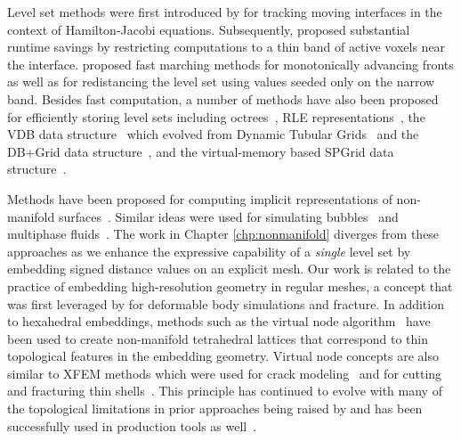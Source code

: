 Level set methods were first introduced by \citet{OsherS:1988} for tracking moving interfaces in the
context of Hamilton-Jacobi equations.  Subsequently, \citet{AdalsS:1994} proposed substantial runtime savings
by restricting computations to a thin band of active voxels near the
interface.  \citet{Sethi:1998} proposed fast marching
methods for monotonically advancing fronts as well as for redistancing
the level set using values seeded only on the narrow band.  Besides
fast computation, a number of methods have also been proposed for
efficiently storing level sets including octrees~\citep{LosasGF:2004},
RLE representations~\citep{HoustNBNM:2006,IrvinGLF:2006,ChentM:2011},
the VDB data structure~\citep{Muset:2013} which evolved from Dynamic
Tubular Grids~\citep{NielsM:2006} and the DB+Grid data
structure~\citep{Muset:2011}, and the virtual-memory based SPGrid data
structure~\citep{SetalABS:2014}.

Methods have been proposed for computing implicit representations of
non-manifold surfaces~\citep{BloomF:1995,YuanYW:2012}. Similar ideas
were used for simulating bubbles~\citep{ZhengYP:2006} and multiphase
fluids~\citep{LosasSSF:2006}. The work in Chapter \ref{chp:nonmanifold}
diverges from these approaches as we enhance the expressive capability
of a \emph{single} level set by embedding signed distance values on an
explicit mesh. Our work is related to the practice of embedding
high-resolution geometry in regular meshes, a concept that was first
leveraged by \citet{MulleTG:2004} for deformable
body simulations and fracture.  In addition to hexahedral embeddings,
methods such as the virtual node algorithm~\citep{MolinBF:2004} have
been used to create non-manifold tetrahedral lattices that correspond
to thin topological features in the embedding geometry. Virtual node
concepts are also similar to XFEM methods which were used for crack
modeling~\citep{MoeesDB:1999} and for cutting and fracturing thin
shells~\citep{KaufmMBGG:2009}. This principle has continued to evolve
with many of the topological limitations in prior approaches being
raised by \citet{SifakDF:2007} and has been
successfully used in production tools as well~\citep{HellrSSST:2009}.

